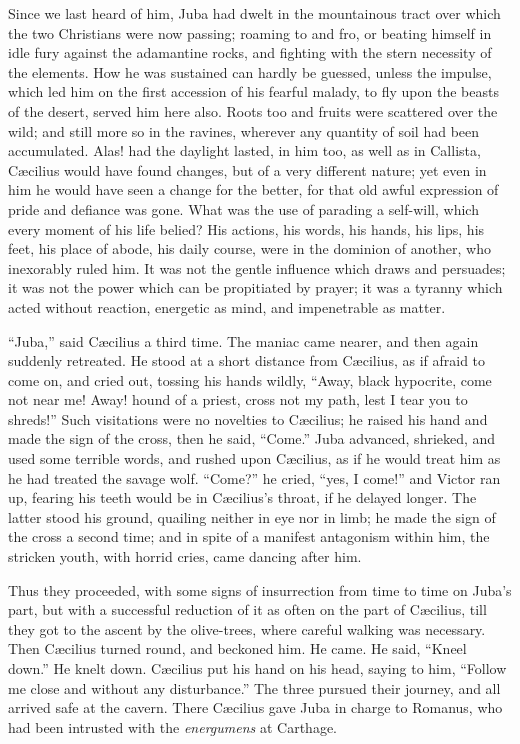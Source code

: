 Since we last heard of him, Juba had dwelt in the mountainous tract
over which the two Christians were now passing; roaming to and fro, or
beating himself in idle fury against the adamantine rocks, and
fighting with the stern necessity of the elements. How he was
sustained can hardly be guessed, unless the impulse, which led him on
the first accession of his fearful malady, to fly upon the beasts of
the desert, served him here also. Roots too and fruits were scattered
over the wild; and still more so in the ravines, wherever any quantity
of soil had been accumulated. Alas! had the daylight lasted, in him
too, as well as in Callista, Cæcilius would have found changes, but
of a very different nature; yet even in him he would have seen a
change for the better, for that old awful expression of pride and
defiance was gone. What was the use of parading a self-will,
which every moment of his life belied? His actions, his words, his
hands, his lips, his feet, his place of abode, his daily course, were
in the dominion of another, who inexorably ruled him. It was not the
gentle influence which draws and persuades; it was not the power which
can be propitiated by prayer; it was a tyranny which acted without
reaction, energetic as mind, and impenetrable as matter.

``Juba,'' said Cæcilius a third time. The maniac came
nearer, and then again suddenly retreated. He stood at a short
distance from Cæcilius, as if afraid to come on, and cried out,
tossing his hands wildly, ``Away, black hypocrite, come not near
me! Away! hound of a priest, cross not my path, lest I tear you to
shreds!'' Such visitations were no novelties to Cæcilius; he
raised his hand and made the sign of the cross, then he said,
``Come.'' Juba advanced, shrieked, and used some terrible
words, and rushed upon Cæcilius, as if he would treat him as he had
treated the savage wolf. ``Come?'' he cried, ``yes, I
come!'' and Victor ran up, fearing his teeth would be in Cæcilius's
throat, if he delayed longer. The latter stood his ground, quailing
neither in eye nor in limb; he made the sign of the cross a second
time; and in spite of a manifest antagonism within him, the stricken
youth, with horrid cries, came dancing after him.

Thus they proceeded, with some signs of insurrection from time to
time on Juba's part, but with a successful reduction of it as
often on the part of Cæcilius, till they got to the ascent by the
olive-trees, where careful walking was necessary. Then Cæcilius
turned round, and beckoned him. He came. He said, ``Kneel
down.'' He knelt down. Cæcilius put his hand on his head, saying
to him, ``Follow me close and without any disturbance.'' The
three pursued their journey, and all arrived safe at the cavern. There
Cæcilius gave Juba in charge to Romanus, who had been intrusted with
the \emph{energumens} at Carthage.

